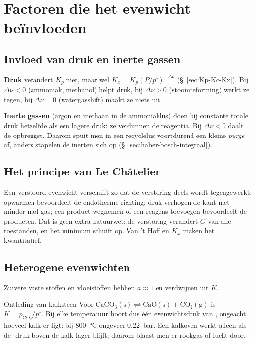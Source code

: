 \section{Factoren die het evenwicht be\"invloeden}

\subsection{Invloed van druk en inerte gassen}
\label{sec:druk-inerte-gassen}

\textbf{Druk} verandert $K_p$ niet, maar wel $K_x = K_p (P/p^\circ)^{-\Delta\nu}$ (\S~\ref{sec:Kp-Kc-Kx}). Bij $\Delta\nu < 0$ (ammoniak, methanol) helpt druk, bij $\Delta\nu > 0$ (stoomreforming) werkt ze tegen, bij $\Delta\nu = 0$ (watergasshift) maakt ze niets uit.

\textbf{Inerte gassen} (argon en methaan in de ammoniaklus) doen bij constante totale druk hetzelfde als een lagere druk: ze verdunnen de reagentia. Bij $\Delta\nu < 0$ daalt de opbrengst. Daarom spuit men in een recyclelus voortdurend een kleine \emph{purge} af, anders stapelen de inerten zich op (\S~\ref{sec:haber-bosch-integraal}).

\subsection{Het principe van Le Ch\^atelier}
\label{sec:le-chatelier-reagerend}\label{sec:le-chatelier}

Een verstoord evenwicht verschuift zo dat de verstoring deels wordt tegengewerkt:
opwarmen bevoordeelt de endotherme richting; druk verhogen de kant met minder mol gas; een product wegnemen of een reagens toevoegen bevoordeelt de producten. Dat is geen extra natuurwet: de verstoring verandert $G$ van alle toestanden, en het minimum schuift op. Van 't Hoff en $K_x$ maken het kwantitatief.

\subsection{Heterogene evenwichten}
\label{sec:heterogene-evenwichten}

Zuivere vaste stoffen en vloeistoffen hebben $a \approx 1$ en verdwijnen uit $K$.

\begin{voorbeeld}{Ontleding van kalksteen}
Voor $\mathrm{CaCO_3(s) \rightleftharpoons CaO(s) + CO_2(g)}$ is $K = p_{\mathrm{CO_2}}/p^\circ$. Bij elke temperatuur hoort dus \'e\'en evenwichtsdruk van , ongeacht hoeveel kalk er ligt: bij \SI{800}{\celsius} ongeveer \SI{0.22}{\bar}. Een kalkoven werkt alleen als de -druk boven de kalk lager blijft; daarom blaast men er rookgas of lucht door.
\end{voorbeeld}

